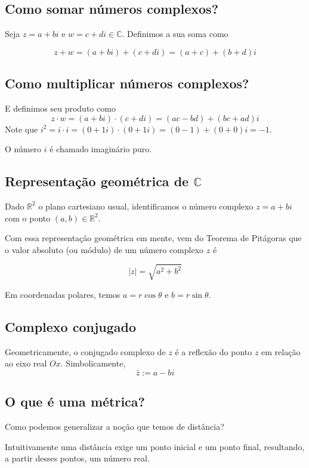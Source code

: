 \documentclass[12pt,a4paper]{article}
\begin{document}
\subsection{Como somar números complexos?}

Seja $z = a + bi$ e $w = c+di \in \mathbb{C}$. Definimos a sua soma como

$$
z+w = (a+bi) + (c+di) = (a+c)+(b+d)i
$$

\subsection{Como multiplicar números complexos?}

E definimos seu produto como
$$
z \cdot w = (a+bi) \cdot (c+di) = (ac-bd) + (bc+ad)i
$$
Note que $i^2 = i \cdot i = (0+1i) \cdot (0+1i) = (0-1) + (0+0)i = -1$.

O número $i$ é chamado imaginário puro.

\subsection{Representação geométrica de $\mathbb{C}$}

Dado $\mathbb{R}^2$ o plano cartesiano usual, identificamos o número complexo $z = a+bi$ com o ponto $(a, b) \in \mathbb{R}^2$.

Com essa representação geométrica em mente, vem do Teorema de Pitágoras que o valor absoluto (ou módulo) de um número complexo $z$ é

$$
|z| = \sqrt{a^2 + b^2}
$$

Em coordenadas polares, temos $a = r \cos \theta$ e $b = r \sin \theta$.

\subsection{Complexo conjugado}

Geometricamente, o conjugado complexo de $z$ é a reflexão do ponto $z$ em relação ao eixo real $Ox$. Simbolicamente,
$$
\bar{z} := a-bi
$$

\subsection{O que é uma métrica?}

Como podemos generalizar a noção que temos de distância?

Intuitivamente uma distância exige um ponto inicial e um ponto final, resultando, a partir desses pontos, um número real.
\end{document}
